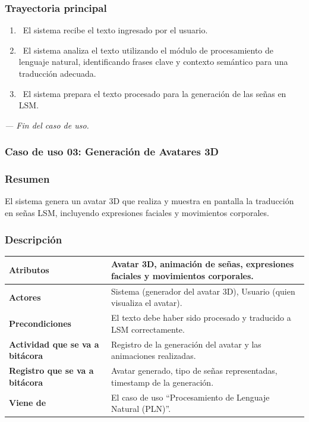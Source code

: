 \subsubsection{Trayectoria principal}
\begin{enumerate}[label=\textbf{\arabic*}, leftmargin=1.5cm]
    \item \UCsystem \ El sistema recibe el texto ingresado por el usuario.
    
    \item \UCsystem \ El sistema analiza el texto utilizando el módulo de procesamiento de lenguaje natural, identificando frases clave y contexto semántico para una traducción adecuada.
    
    \item \UCsystem \ El sistema prepara el texto procesado para la generación de las señas en LSM.

\end{enumerate}

\textit{--- Fin del caso de uso.}

\subsubsection{Caso de uso 03: Generación de Avatares 3D}
\subsubsection{Resumen}
El sistema genera un avatar 3D que realiza y muestra en pantalla la traducción en señas LSM, incluyendo expresiones faciales y movimientos corporales.
\subsubsection{Descripción}
\noindent
\begin{tabularx}{\textwidth}{|l|X|}
\hline
\textbf{Atributos} & Avatar 3D, animación de señas, expresiones faciales y movimientos corporales. \\ \hline
\textbf{Actores} & Sistema (generador del avatar 3D), Usuario (quien visualiza el avatar). \\ \hline
\textbf{Precondiciones} & El texto debe haber sido procesado y traducido a LSM correctamente. \\ \hline
\textbf{Actividad que se va a bitácora} & Registro de la generación del avatar y las animaciones realizadas. \\ \hline
\textbf{Registro que se va a bitácora} & Avatar generado, tipo de señas representadas, timestamp de la generación. \\ \hline
\textbf{Viene de} & El caso de uso “Procesamiento de Lenguaje Natural (PLN)”. \\ \hline
\end{tabularx}

